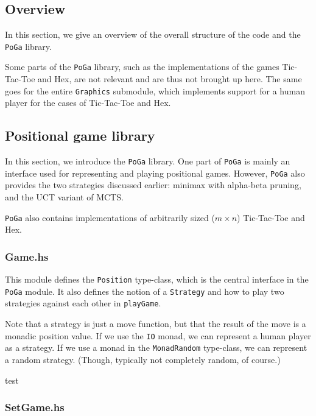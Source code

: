 \subsection {Overview}

In this section, we give an overview of the overall structure of the code and the \texttt{PoGa} library.


Some parts of the \texttt{PoGa} library, such as the implementations of the games Tic-Tac-Toe and Hex, are not relevant and are thus not brought up here.
The same goes for the entire \texttt{Graphics} submodule, which implements support for a human player for the cases of Tic-Tac-Toe and Hex.

\subsection {Positional game library}

In this section, we introduce the \texttt{PoGa} library.
One part of \texttt{PoGa} is mainly an interface used for representing and playing positional games.
However, \texttt{PoGa} also provides the two strategies discussed earlier: minimax with alpha-beta pruning, and the UCT variant of MCTS.

\texttt{PoGa} also contains implementations of arbitrarily sized ($m \times n$) Tic-Tac-Toe and Hex.

\subsubsection {Game.hs}

This module defines the \texttt{Position} type-class, which is the central interface in the \texttt{PoGa} module.
It also defines the notion of a \texttt{Strategy} and how to play two strategies against each other in \texttt{playGame}.

Note that a strategy is just a move function, but that the result of the move is a monadic position value.
If we use the \texttt{IO} monad, we can represent a human player as a strategy. If we use a monad in the \texttt{MonadRandom} type-class, we can represent a random strategy. (Though, typically not completely random, of course.)

\begin{code}
test
\end{code}

\subsubsection{SetGame.hs}

